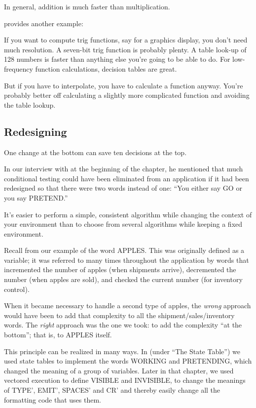 In general, addition is much faster than multiplication.

\begin{interview}
 provides another example:
\begin{tfquot}
If you want to compute trig functions, say for a graphics display, you don't
need much resolution. A seven-bit trig function is probably plenty. A table
look-up of 128 numbers is faster than anything else you're going to be able
to do. For low-frequency function calculations, decision tables are great.

But if you have to interpolate, you have to calculate a function anyway.
You're probably better off calculating a slightly more complicated function
and avoiding the table lookup.
\end{tfquot}
\end{interview}
\subsection{Redesigning}
\begin{tip}
One change at the bottom can save ten decisions at the top.
\end{tip}
In our interview with  at
the beginning of the chapter, he mentioned
that much conditional testing could have been eliminated from an
application if it had been redesigned so that there were two words instead
of one: ``You either say GO or you say PRETEND.''

It's easier to perform a simple, consistent algorithm while changing
the context of your environment than to choose from several algorithms
while keeping a fixed environment.

Recall from  our example of the word APPLES. This
was originally defined as a variable; it was referred to many times
throughout the application by words that incremented the number of
apples (when shipments arrive), decremented the number (when apples are
sold), and checked the current number (for inventory control).

When it became necessary to handle a second type of apples, the
\emph{wrong} approach would have been to add that complexity to all
the shipment/\hy sales/\hy inventory words. The \emph{right} approach
was the one we took: to add the complexity ``at the bottom''; that is,
to APPLES itself.

This principle can be realized in many ways. In 
(under ``The State Table'') we used state tables to implement the words
WORKING and PRETENDING, which changed the meaning of a group
of variables. Later in that chapter, we used vectored execution to define
VISIBLE and INVISIBLE, to change the meanings of TYPE', EMIT',
SPACES' and CR' and thereby easily change all the formatting code that
uses them.

